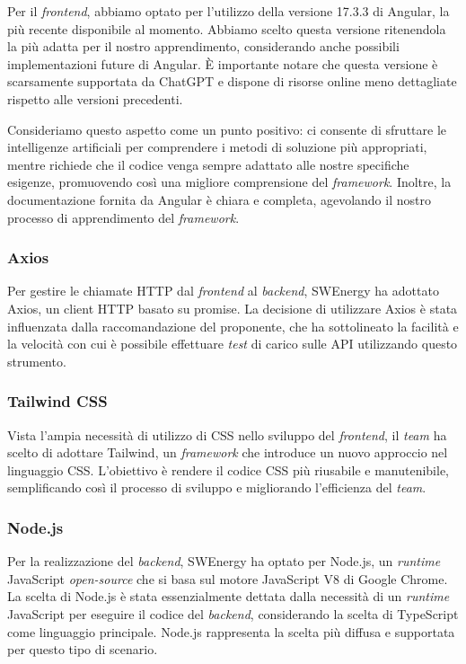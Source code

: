 Per il \textit{frontend}, abbiamo optato per l'utilizzo della versione 17.3.3 di
Angular, la più recente disponibile al momento. Abbiamo scelto questa versione
ritenendola la più adatta per il nostro apprendimento, considerando anche
possibili implementazioni future di Angular. È importante notare che questa
versione è scarsamente supportata da ChatGPT e dispone di risorse online meno
dettagliate rispetto alle versioni precedenti.

Consideriamo questo aspetto come un punto positivo: ci consente di sfruttare le
intelligenze artificiali per comprendere i metodi di soluzione più appropriati,
mentre richiede che il codice venga sempre adattato alle nostre specifiche
esigenze, promuovendo così una migliore comprensione del \textit{framework}.
Inoltre, la documentazione fornita da Angular è chiara e completa, agevolando il
nostro processo di apprendimento del \textit{framework}.


\subsubsection{Axios}
Per gestire le chiamate HTTP dal \textit{frontend} al \textit{backend}, SWEnergy
ha adottato Axios, un client HTTP basato su promise. La decisione di utilizzare
Axios è stata influenzata dalla raccomandazione del proponente, che ha
sottolineato la facilità e la velocità con cui è possibile effettuare \textit{test} di
carico sulle API utilizzando questo strumento.


\subsubsection{Tailwind CSS}
Vista l'ampia necessità di utilizzo di CSS nello sviluppo del \textit{frontend},
il \textit{team} ha scelto di adottare Tailwind, un \textit{framework} che introduce un
nuovo approccio nel linguaggio CSS. L'obiettivo è rendere il codice CSS più
riusabile e manutenibile, semplificando così il processo di sviluppo e
migliorando l'efficienza del \textit{team}.


\subsubsection{Node.js}
Per la realizzazione del \textit{backend}, SWEnergy ha optato per Node.js, un
\textit{runtime} JavaScript \textit{open-source} che si basa sul motore JavaScript V8 di
Google Chrome. La scelta di Node.js è stata essenzialmente dettata dalla
necessità di un \textit{runtime} JavaScript per eseguire il codice del
\textit{backend}, considerando la scelta di TypeScript come linguaggio
principale. Node.js rappresenta la scelta più diffusa e supportata per questo
tipo di scenario.


